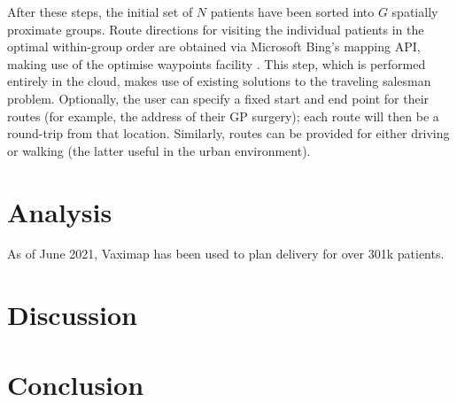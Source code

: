 \documentclass[11pt]{amsart}
\begin{document}
After these steps, the initial set of $N$ patients have been sorted into $G$ spatially proximate groups. Route directions for visiting the individual patients in the optimal within-group order are obtained via Microsoft Bing’s mapping API, making use of the optimise waypoints facility \cite{X}. This step, which is performed entirely in the cloud, makes use of existing solutions to the traveling salesman problem. Optionally, the user can specify a fixed start and end point for their routes (for example, the address of their GP surgery); each route will then be a round-trip from that location. Similarly, routes can be provided for either driving or walking (the latter useful in the urban environment). 

\section{Analysis}

As of June 2021, Vaximap has been used to plan delivery for over 301k patients. 

\section{Discussion}

\section{Conclusion}
\end{document}
